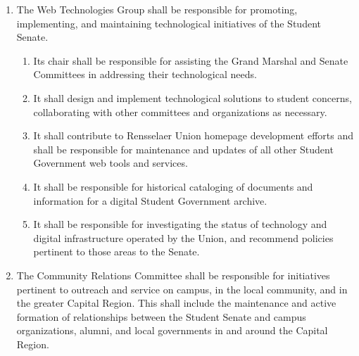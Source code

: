 \begin{enumerate}
\begin{enumerate}
  \item It shall address issues pertaining to student rights and responsibilities as they arise.
    \begin{enumerate}
    \item It shall work with the Dean of Students to discuss pending changes to the Handbook of Student Rights and Responsibilities, or other relevant policies that affect student rights.
    \end{enumerate}
  \item It shall take steps to remedy student concerns regarding student life.
    \begin{enumerate}
    \item It shall advise the administration on issues related to student life, and work with them in addressing these issues.
    \item It shall work and collaborate with the administration and other organizations to initiate new programs that improve the student experience.
    \end{enumerate}
  \end{enumerate}
\item The Web Technologies Group shall be responsible for promoting, implementing, and maintaining technological initiatives of the Student Senate.
  \begin{enumerate}
  \item Its chair shall be responsible for assisting the Grand Marshal and Senate Committees in addressing their technological needs.
  \item It shall design and implement technological solutions to student concerns, collaborating with other committees and organizations as necessary.
  \item It shall contribute to Rensselaer Union homepage development efforts and shall be responsible for maintenance and updates of all other Student Government web tools and services.
  \item It shall be responsible for historical cataloging of documents and information for a digital Student Government archive.
  \item It shall be responsible for investigating the status of technology and digital infrastructure operated by the Union, and recommend policies pertinent to those areas to the Senate.
  \end{enumerate}
\item The Community Relations Committee shall be responsible for initiatives pertinent to outreach and service on campus, in the local community, and in the greater Capital Region. This shall include the maintenance and active formation of relationships between the Student Senate and campus organizations, alumni, and local governments in and around the Capital Region.

\end{enumerate}

